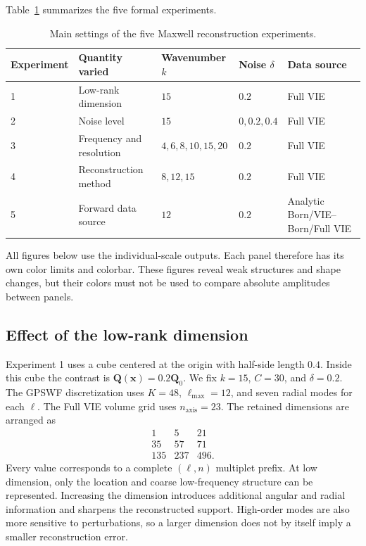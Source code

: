Table~\ref{tab:maxwell-experiment-summary} summarizes the five formal
experiments.
\begin{table}[htbp]
    \centering
    \caption{Main settings of the five Maxwell reconstruction experiments.}
    \label{tab:maxwell-experiment-summary}
    \begin{tabular}{lllll}
        \toprule
        Experiment & Quantity varied & Wavenumber $k$ & Noise $\delta$ & Data source\\
        \midrule
        1 & Low-rank dimension & $15$ & $0.2$ & Full VIE\\
        2 & Noise level & $15$ & $0,0.2,0.4$ & Full VIE\\
        3 & Frequency and resolution & $4,6,8,10,15,20$ & $0.2$ & Full VIE\\
        4 & Reconstruction method & $8,12,15$ & $0.2$ & Full VIE\\
        5 & Forward data source & $12$ & $0.2$ & Analytic Born/VIE--Born/Full VIE\\
        \bottomrule
    \end{tabular}
\end{table}

All figures below use the individual-scale outputs. Each panel therefore has
its own color limits and colorbar. These figures reveal weak structures and
shape changes, but their colors must not be used to compare absolute amplitudes
between panels.

\subsection{Effect of the low-rank dimension}
\label{subsec:maxwell-exp1}

Experiment 1 uses a cube centered at the origin with half-side length $0.4$.
Inside this cube the contrast is $\mathbf{Q}(\mathbf{x})=0.2\mathbf{Q}_0$.
We fix $k=15$, $C=30$, and $\delta=0.2$. The GPSWF discretization uses
$K=48$, $\ell_{\max}=12$, and seven radial modes for each $\ell$. The Full VIE
volume grid uses $n_{\mathrm{axis}}=23$. The retained
dimensions are arranged as
\[
\begin{array}{ccc}
1&5&21\\
35&57&71\\
135&237&496.
\end{array}
\]
Every value corresponds to a complete $(\ell,n)$ multiplet prefix. At low
dimension, only the location and coarse low-frequency structure can be
represented. Increasing the dimension introduces additional angular and radial
information and sharpens the reconstructed support. High-order modes are also
more sensitive to perturbations, so a larger dimension does not by itself imply
a smaller reconstruction error.

